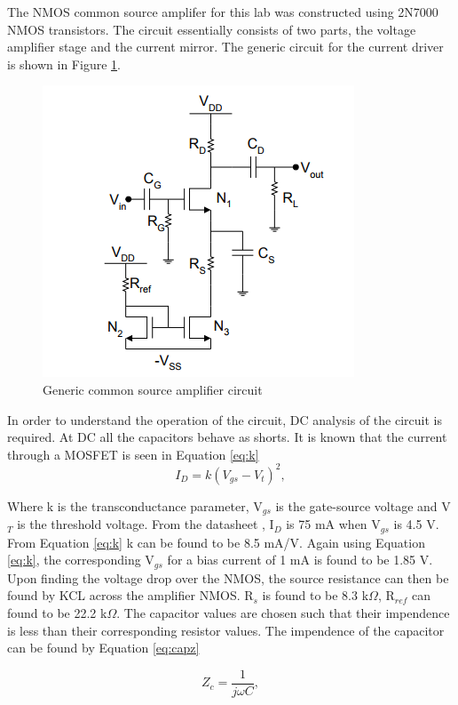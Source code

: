 
	The NMOS common source amplifer for this lab was constructed using 2N7000 NMOS transistors. The circuit essentially consists of two parts, the voltage amplifier stage and the current mirror. The generic circuit for the current driver is shown in Figure \ref{fig:currentgeneric}. 
	
	\begin{figure}[H]
		\centering
		\includegraphics[width=.55\textwidth]{CircuitDevelopment/genericschem.png}
		\caption{Generic common source amplifier circuit \cite{b1}}
		\label{fig:currentgeneric}
	\end{figure}
	
	In order to understand the operation of the circuit, DC analysis of the circuit is required. At DC all the capacitors behave as shorts. It is known that the current through a MOSFET is seen in Equation \ref{eq:k}
	\begin{equation}\label{eq:k}
	I_D = k(V_{gs}-V_t)^2,
	\end{equation}
	
	Where k is the transconductance parameter, V$_{gs}$ is the gate-source voltage and V$_T$ is the threshold voltage. From the datasheet \cite{NMOS},  I$_D$ is 75 mA when V$_{gs}$ is 4.5 V. From Equation \ref{eq:k} k can be found to be 8.5 mA/V. Again using Equation \ref{eq:k}, the corresponding V$_{gs}$ for a bias current of 1 mA is found to be 1.85 V. 
	Upon finding the voltage drop over the NMOS, the source resistance can then be found by KCL across the amplifier NMOS. R$_{s}$ is found to be 8.3 k$\Omega$, R$_{ref}$ can found to be 22.2 k$\Omega$. The capacitor values are chosen such that their impendence is less than their corresponding resistor values. The impendence of the capacitor can be found by Equation \ref{eq:capz}
	
	\begin{equation}\label{eq:capz}
	Z_c = \frac{1}{j\omega C},
	\end{equation}
	

